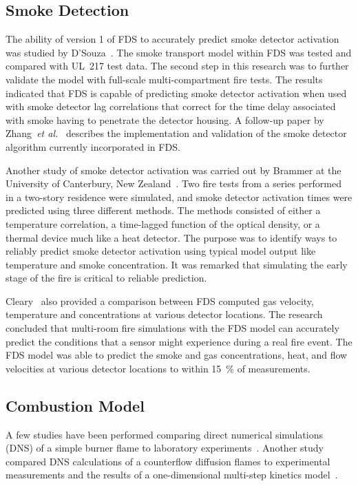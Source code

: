 \subsection{Smoke Detection}

The ability of  version 1 of FDS to  accurately predict smoke detector activation was studied by D'Souza~\cite{DSouza:1}. The smoke transport model
within FDS  was tested and compared with UL~217 test data.  The second step  in this research was  to further validate  the model with full-scale
multi-compartment fire tests.  The results  indicated that FDS is capable of predicting  smoke detector activation when used with smoke  detector
lag correlations  that  correct  for  the time  delay associated with smoke having to penetrate the detector housing. A follow-up paper by
Zhang~{\em et al.}~\cite{Zhang:FSJ2008} describes the implementation and validation of the smoke detector algorithm currently incorporated in FDS.

Another study of smoke detector  activation was carried out by Brammer at  the University  of Canterbury,  New  Zealand~\cite{Brammer:1}. Two fire
tests from  a series  performed  in a  two-story residence  were simulated, and  smoke detector  activation times were  predicted using three
different methods. The methods consisted of either a temperature correlation,  a time-lagged  function  of the  optical  density, or  a thermal
device much like a heat detector.  The purpose was to identify ways to reliably predict smoke detector activation using typical model output like
temperature and  smoke concentration. It was remarked that simulating  the  early stage  of  the  fire  is critical  to  reliable prediction.

Cleary~\cite{Cleary:1} also provided a comparison between FDS computed gas  velocity,  temperature  and  concentrations at  various  detector
locations.   The research concluded  that multi-room  fire simulations with the FDS model can accurately predict the conditions that a sensor might
experience during a real fire  event.  The FDS model was able to predict the smoke and gas concentrations, heat, and flow velocities at various
detector locations to within 15~\% of measurements.


\subsection{Combustion Model}

A few studies have been performed comparing direct numerical
simulations (DNS) of a simple burner flame to laboratory
experiments~\cite{Mukhopadhyay:1}. Another study compared DNS
calculations of a counterflow diffusion flames to experimental
measurements and the results of a one-dimensional multi-step kinetics
model~\cite{Hamins:NASA}.

